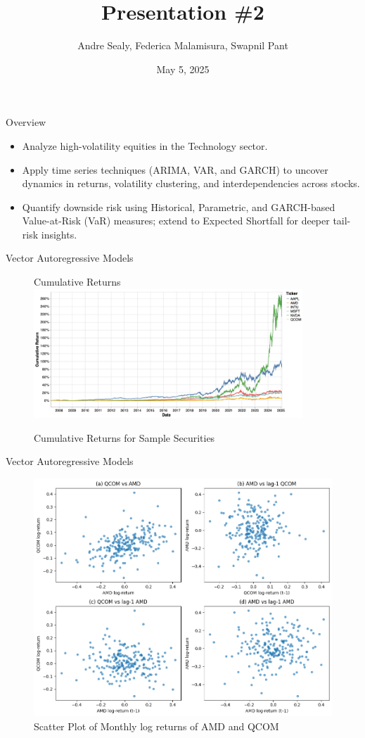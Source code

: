 \documentclass{beamer}[9pt]
\title{Presentation \#2}
\author{Andre Sealy, Federica Malamisura, Swapnil Pant}
\institute{Stevens Institute of Technology}
\date{May 5, 2025}
\begin{document}
	
	\frame{\titlepage}
	
	\begin{frame}{Overview}
		\begin{itemize}
			\item Analyze high-volatility equities in the Technology sector.
			\item Apply time series techniques (ARIMA, VAR, and GARCH) to uncover dynamics in returns, volatility clustering, and interdependencies across stocks.
			\item Quantify downside risk using Historical, Parametric, and GARCH-based Value-at-Risk (VaR) measures; extend to Expected Shortfall for deeper tail-risk insights.
		\end{itemize}
	\end{frame}
	

\begin{frame}{Vector Autoregressive Models}
	\begin{figure}{Cumulative Returns}
		\centering
		\includegraphics[width=0.9\textwidth]{plots/sample_stocks.png} %
		\caption{Cumulative Returns for Sample Securities}
	\end{figure}
\end{frame}

\begin{frame}{Vector Autoregressive Models}
	\begin{figure}[!h]
		\centering
		\includegraphics[width=0.8\linewidth]{plots/amd_qcom_scatter.png}
		\caption{Scatter Plot of Monthly log returns of AMD and QCOM}
		\label{fig:amd_qcom_scatter}
	\end{figure}
\end{frame}
\end{document}
